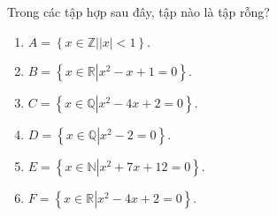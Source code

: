 \begin{bt}%
	Trong các tập hợp sau đây, tập nào là  tập rỗng?
	\begin{enumerate}
		\item $A=\left\{{x\in  \mathbb{Z}\left|{|x|<1}\right.}\right\}$.
		\item $B=\left\{{x\in  \mathbb{R}\left|{x^2-x+1=0}\right.}\right\}$.
		 \item $C=\left\{{x\in \mathbb{Q}\left|{x^2-4x+2=0}\right.}\right\}$.
		 \item $D=\left\{{x\in \mathbb{Q}\left|{x^2-2=0}\right.}\right\}$.
		\item  $E=\left\{{x\in \mathbb{N}\left|{x^2+7x+12=0}\right.}\right\}$.
		 \item $F=\left\{{x\in \mathbb{R}\left|{x^2-4x+2=0}\right.}\right\}$.
	\end{enumerate}
\end{bt}

